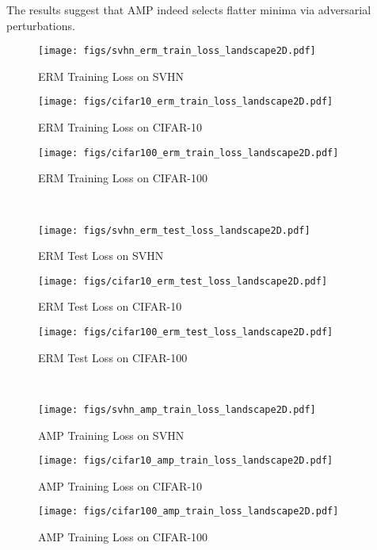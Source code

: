 \documentclass[final]{cvpr}
\begin{document}
The results suggest that AMP indeed selects flatter minima via adversarial perturbations.

\begin{figure*}[t]
\centering
\begin{subfigure}{0.66\columnwidth}\centering \captionsetup{width=0.9\columnwidth}\texttt{[image: figs/svhn\_erm\_train\_loss\_landscape2D.pdf]}\caption{ERM Training Loss on SVHN}\end{subfigure}\begin{subfigure}{0.66\columnwidth}\centering \captionsetup{width=0.9\columnwidth}\texttt{[image: figs/cifar10\_erm\_train\_loss\_landscape2D.pdf]}\caption{ERM Training Loss on CIFAR-10}\end{subfigure}\begin{subfigure}{0.66\columnwidth}\centering \captionsetup{width=0.9\columnwidth}\texttt{[image: figs/cifar100\_erm\_train\_loss\_landscape2D.pdf]}\caption{ERM Training Loss on CIFAR-100}\end{subfigure}\\
\begin{subfigure}{0.66\columnwidth}\centering \captionsetup{width=0.9\columnwidth}\texttt{[image: figs/svhn\_erm\_test\_loss\_landscape2D.pdf]}\caption{ERM Test Loss on SVHN}\end{subfigure}\begin{subfigure}{0.66\columnwidth}\centering \captionsetup{width=0.9\columnwidth}\texttt{[image: figs/cifar10\_erm\_test\_loss\_landscape2D.pdf]}\caption{ERM Test Loss on CIFAR-10}\end{subfigure}\begin{subfigure}{0.66\columnwidth}\centering \captionsetup{width=0.9\columnwidth}\texttt{[image: figs/cifar100\_erm\_test\_loss\_landscape2D.pdf]}\caption{ERM Test Loss on CIFAR-100}\end{subfigure}\\
\begin{subfigure}{0.66\columnwidth}\centering \captionsetup{width=0.9\columnwidth}\texttt{[image: figs/svhn\_amp\_train\_loss\_landscape2D.pdf]}\caption{AMP Training Loss on SVHN}\end{subfigure}\begin{subfigure}{0.66\columnwidth}\centering \captionsetup{width=0.9\columnwidth}\texttt{[image: figs/cifar10\_amp\_train\_loss\_landscape2D.pdf]}\caption{AMP Training Loss on CIFAR-10}\end{subfigure}\begin{subfigure}{0.66\columnwidth}\centering \captionsetup{width=0.9\columnwidth}\texttt{[image: figs/cifar100\_amp\_train\_loss\_landscape2D.pdf]}\caption{AMP Training Loss on CIFAR-100}\end{subfigure}\\

\end{figure*}
\end{document}
